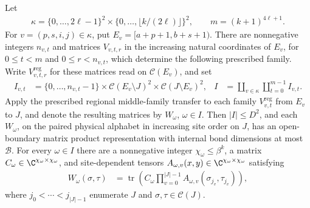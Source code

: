 \begin{lemma}
    \label{thm:physical_polynomial_canonical_middle_family}
    \leanok
    Let
    \begin{align}
        \kappa=\{0,\ldots,2\ell-1\}^2\times
        \{0,\ldots,\lfloor k/(2\ell)\rfloor\}^2,
        \qquad m=(k+1)^{4\ell+1}.
        \label{eq:physical_polynomial_crossing_index}
    \end{align}
    For $v=(p,s,i,j)\in\kappa$, put
    $E_v=[a+p+1,b+s+1)$.
    There are nonnegative integers $n_{v,t}$ and matrices $V_{v,t,r}$ in the
    increasing natural coordinates of $E_v$, for $0\le t<m$ and
    $0\le r<n_{v,t}$, which determine the following prescribed family.
    Write $V^{\mathrm{reg}}_{v,t,r}$ for these matrices read on
    $\mathcal C(E_v)$, and set
    \begin{align}
        I_{v,t} & =\{0,\ldots,n_{v,t}-1\}\times
        \mathcal C(E_v\setminus J)^2\times\mathcal C(J\setminus E_v)^2,
                & I                             & =\coprod_{v\in\kappa}\coprod_{t=0}^{m-1} I_{v,t}.
        \label{eq:physical_polynomial_canonical_index}
    \end{align}
    Apply the prescribed regional middle-family transfer to each family
    $V^{\mathrm{reg}}_{v,t}$ from $E_v$ to $J$, and denote the resulting
    matrices by $W_\omega$, $\omega\in I$. Then $|I|\le D^2$, and each
    $W_\omega$, on the paired physical alphabet in increasing site order on
    $J$, has an open-boundary matrix product representation with internal
    bond dimensions at most $\mathcal B$.
    For every $\omega\in I$ there are a nonnegative integer
    $\chi_\omega\le\beta^k$, a matrix
    $C_\omega\in\C^{\chi_\omega\times\chi_\omega}$, and site-dependent tensors
    $A_{\omega,v}(x,y)\in\C^{\chi_\omega\times\chi_\omega}$ satisfying
    \begin{align}
        W_\omega(\sigma,\tau)
         & =\operatorname{tr}\left(C_\omega
        \prod_{v=0}^{|J|-1}A_{\omega,v}(\sigma_{j_v},\tau_{j_v})\right),
        \label{eq:physical_polynomial_trace_presentation}
    \end{align}
    where $j_0<\cdots<j_{|J|-1}$ enumerate $J$ and
    $\sigma,\tau\in\mathcal C(J)$.


\end{lemma}
